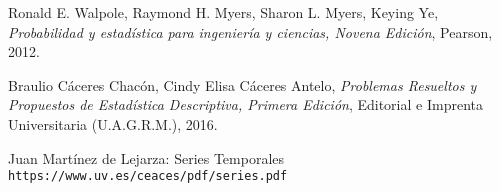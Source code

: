 

\begin{thebibliography}{9}
Ronald E. Walpole, Raymond H. Myers, Sharon L. Myers, Keying Ye, \textit{Probabilidad y estadística para ingeniería y ciencias, Novena Edición}, Pearson, 2012. 
 
Braulio Cáceres Chacón, Cindy Elisa Cáceres Antelo, \textit{Problemas Resueltos y Propuestos de Estadística Descriptiva, Primera Edición}, Editorial e Imprenta Universitaria (U.A.G.R.M.), 2016.

 
Juan Martínez de Lejarza: Series Temporales
\\\texttt{https://www.uv.es/ceaces/pdf/series.pdf}
\end{thebibliography}

